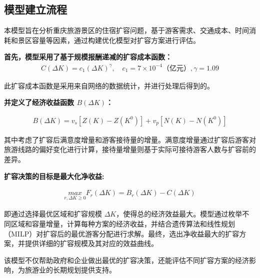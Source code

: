 \subsection[\hspace{-2pt}模型建立流程]{{\heiti{}\hspace{-8pt}模型建立流程}}\label{subsec:3-model-build}


本模型旨在分析重庆旅游景区的住宿扩容问题，基于游客需求、交通成本、时间消耗和景区容量等因素，通过构建优化模型对扩容方案进行评估。

\noindent\textbf{首先，模型采用了基于规模报酬递减的扩容成本函数：}
\begin{equation}
  \begin{aligned}
    C(\Delta K)=c_{1}(\Delta K)^{\gamma}, \quad c_{1} =7\times 10^{-4}\text{（亿元）}, \gamma = 1.09
  \end{aligned}
\end{equation}

此扩容成本函数是采用来自网络的数据统计，并进行处理后得到的。

\noindent\textbf{并定义了经济收益函数 $B(\Delta K)$：}

\begin{equation}
  \begin{aligned}
    B(\Delta K) = v_{s}[Z(K)-Z(K^0)]+v_{p}[N(K)-N(K^{0})]
  \end{aligned}
\end{equation}

其中考虑了扩容后满意度增量和游客接待量的增量。满意度增量通过扩容后游客对旅游线路的偏好变化进行计算，接待量增量则基于实际可接待游客人数与扩容前的差异。

\noindent\textbf{扩容决策的目标是最大化净收益:}

\begin{equation}
  \begin{aligned}
    \underset{r,\Delta K\geq 0}{max}  F_r(\Delta K) = B_r(\Delta K) - C(\Delta K)
  \end{aligned}
\end{equation}

即通过选择最优区域和扩容规模 $\Delta K$，使得总的经济效益最大。模型通过枚举不同区域和容量增量，计算每种方案的经济收益，并结合遗传算法和线性规划（MILP）对扩容后的最优游客分配进行求解。最终，选出净收益最大的扩容方案，并提供详细的扩容规模及其对应的效益曲线。



该模型不仅帮助政府和企业做出最优的扩容决策，还能评估不同扩容方案的经济影响，为旅游业的长期规划提供支持。

